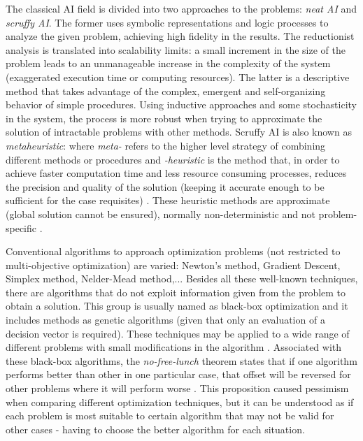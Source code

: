     
    The classical AI field is divided into two approaches to the problems: \textit{neat AI} and \textit{scruffy AI}. The former uses symbolic representations and logic processes to analyze the given problem, achieving high fidelity in the results. The reductionist analysis is translated into scalability limits: a small increment in the size of the problem leads to an unmanageable increase in the complexity of the system (exaggerated execution time or computing resources). The latter is a descriptive method that takes advantage of the complex, emergent and self-organizing behavior of simple procedures. Using inductive approaches and some stochasticity in the system, the process is more robust when trying to approximate the solution of intractable problems with other methods. Scruffy AI is also known as \textit{metaheuristic}: where \textit{meta-} refers to the higher level strategy of combining different methods or procedures and \textit{-heuristic} is the method that, in order to achieve faster computation time and less resource consuming processes, reduces the precision and quality of the solution (keeping it accurate enough to be sufficient for the case requisites) . These heuristic methods are approximate (global solution cannot be ensured), normally non-deterministic and not problem-specific \cite{cleverAlgorithms}.
 
    Conventional algorithms to approach optimization problems (not restricted to multi-objective optimization) are varied: Newton's method, Gradient Descent, Simplex method, Nelder-Mead method,... Besides all these well-known techniques, there are algorithms that do not exploit information given from the problem to obtain a solution. This group is usually named as black-box optimization and it includes methods as genetic algorithms (given that only an evaluation of a decision vector is required). These techniques may be applied to a wide range of different problems with small modifications in the algorithm \cite{droste2006upper}. Associated with these black-box algorithms, the \textit{no-free-lunch} theorem states that if one algorithm performs better than other in one particular case, that offset will be reversed for other problems where it will perform worse \cite{wolpert1997no}. This proposition caused pessimism when comparing different optimization techniques, but it can be understood as if each problem is most suitable to certain algorithm that may not be valid for other cases - having to choose the better algorithm for each situation.

\newpage

